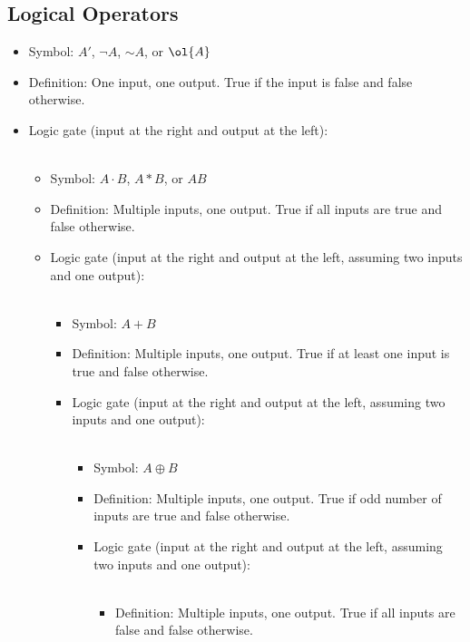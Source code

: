 \documentclass[a4paper,12pt]{article}
\begin{document}
\subsection{Logical Operators}
\begin{itemize}
\item Symbol: $A'$, $\neg A$, $\mathord{\sim}A$, or $\ol{A}$
\item Definition: One input, one output. True if the input is false and false otherwise.
\item Logic gate (input at the right and output at the left):\\\mbox{}\\
\eit 
{}
\begin{itemize}
\item Symbol: $A \cdot B$, $A*B$, or $AB$
\item Definition: Multiple inputs, one output. True if all inputs are true and false otherwise.
\item Logic gate (input at the right and output at the left, assuming two inputs and one output):\\\mbox{}\\
\eit
{}
\begin{itemize}
\item Symbol: $A + B$
\item Definition: Multiple inputs, one output. True if at least one input is true and false otherwise.
\item Logic gate (input at the right and output at the left, assuming two inputs and one output):\\\mbox{}\\
\eit
{}
\begin{itemize}
\item Symbol: $A \oplus B$
\item Definition: Multiple inputs, one output. True if odd number of inputs are true and false otherwise.
\item Logic gate (input at the right and output at the left, assuming two inputs and one output):\\\mbox{}\\
\eit
{}
\begin{itemize}
\item Definition: Multiple inputs, one output. True if all inputs are false and false otherwise.

\end{itemize}
\end{itemize}
\end{itemize}
\end{itemize}
\end{itemize}
\end{document}
